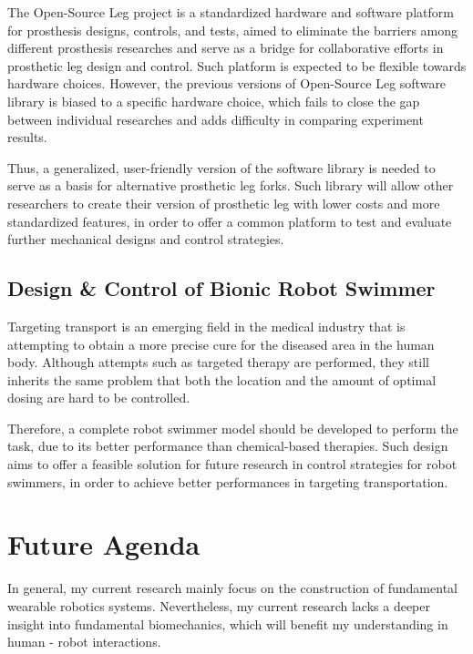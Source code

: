 \documentclass[8pt]{article}
\begin{document}
    The Open-Source Leg project is a standardized hardware and software platform for prosthesis designs, controls, and tests, aimed to eliminate the barriers among different prosthesis researches and serve as a bridge for collaborative efforts in prosthetic leg design and control. Such platform is expected to be flexible towards hardware choices. However, the previous versions of Open-Source Leg software library is biased to a specific hardware choice, which fails to close the gap between individual researches and adds difficulty in comparing experiment results. 

    Thus, a generalized, user-friendly version of the software library is needed to serve as a basis for alternative prosthetic leg forks. Such library will allow other researchers to create their version of prosthetic leg with lower costs and more standardized features, in order to offer a common platform to test and evaluate further mechanical designs and control strategies.

    \subsection{Design \& Control of Bionic Robot Swimmer}  \label{sec:RobotSwimmer}

    Targeting transport is an emerging field in the medical industry that is attempting to obtain a more precise cure for the diseased area in the human body. Although attempts such as targeted therapy are performed, they still inherits the same problem that both the location and the amount of optimal dosing are hard to be controlled. 

    Therefore, a complete robot swimmer model should be developed to perform the task, due to its better performance than chemical-based therapies. Such design aims to offer a feasible solution for future research in control strategies for robot swimmers, in order to achieve better performances in targeting transportation. 
    
    

\section{Future Agenda} \label{sec:Agenda}

In general, my current research mainly focus on the construction of fundamental wearable robotics systems. Nevertheless, my current research lacks a deeper insight into fundamental biomechanics, which will benefit my understanding in human - robot interactions.  
\end{document}
